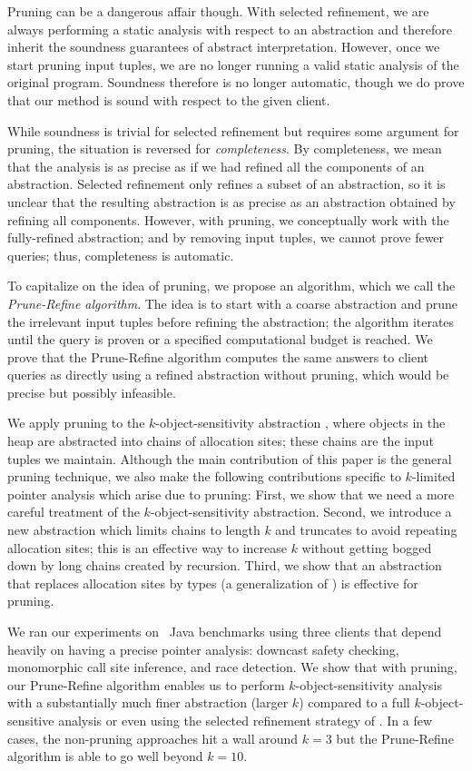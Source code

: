 Pruning can be a dangerous affair though.  With selected refinement,
we are always performing a static analysis with respect to an abstraction
and therefore inherit the soundness guarantees of abstract interpretation.
However, once we start pruning input tuples, we are no longer running a valid
static analysis of the original program.  Soundness therefore is no longer automatic,
though we do prove that our method is sound with respect to the given client.

While soundness is trivial for selected refinement but requires some
argument for pruning, the situation is reversed for {\em completeness}.  By
completeness, we mean that the analysis is as precise as
if we had refined all the components of an abstraction.  Selected
refinement only refines a subset of an abstraction, so it is unclear
that the resulting abstraction is as precise as an abstraction obtained by
refining all components.  However, with pruning, we conceptually work with the
fully-refined abstraction; and by removing input tuples, we cannot prove fewer
queries; thus, completeness is automatic.

To capitalize on the idea of pruning, we propose an algorithm, which we
call the {\em Prune-Refine algorithm}.  The idea is to start with a coarse abstraction
and prune the irrelevant input tuples before refining the abstraction; the
algorithm iterates until the query is proven or a specified computational budget
is reached.  We prove that the Prune-Refine algorithm computes the same answers to client queries
as directly using a refined abstraction without pruning, which would be precise
but possibly infeasible.

We apply pruning to the $k$-object-sensitivity abstraction
\cite{kobj}, where objects in the heap are abstracted into chains of
allocation sites; these chains are the input tuples we maintain.
Although the main contribution of this paper is the general
pruning technique, we also make the following contributions specific to
$k$-limited pointer analysis which arise due to pruning: First, we show
that we need a more careful treatment of the $k$-object-sensitivity abstraction.
Second, we introduce a new abstraction which limits
chains to length $k$ and truncates to avoid repeating
allocation sites; this is an effective way to increase $k$ without getting bogged down by long chains created by recursion.
Third, we show that an abstraction that
replaces allocation sites by types (a generalization of
\cite{smaragdakis11context}) is effective for pruning.

We ran our experiments on \numBenchmarks\ Java benchmarks using three clients that
depend heavily on having a precise pointer analysis: downcast safety
checking, monomorphic call site inference, and race detection.
We show that with pruning, our Prune-Refine algorithm enables us to perform $k$-object-sensitivity
analysis with a substantially much finer abstraction (larger $k$)
compared to a full $k$-object-sensitive analysis or even using the selected
refinement strategy of \cite{liang11minimal}.
In a few cases, the non-pruning approaches hit a wall around $k=3$ but the Prune-Refine
algorithm is able to go well beyond $k=10$.
